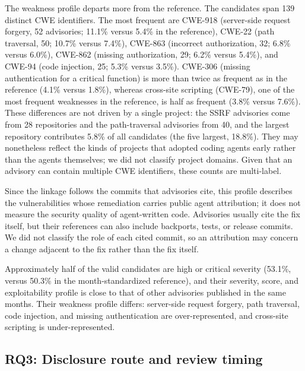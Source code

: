 \documentclass[smallextended,natbib]{svjour3}
\begin{document}
The weakness profile departs more from the reference.  The candidates span 139
distinct CWE identifiers.  The most frequent are CWE-918 (server-side request
forgery, 52 advisories; 11.1\% versus 5.4\% in the reference), CWE-22 (path
traversal, 50; 10.7\% versus 7.4\%), CWE-863 (incorrect authorization, 32;
6.8\% versus 6.0\%), CWE-862 (missing authorization, 29; 6.2\% versus 5.4\%),
and CWE-94 (code injection, 25; 5.3\% versus 3.5\%).  CWE-306 (missing
authentication for a critical function) is more than twice as frequent as in
the reference (4.1\% versus 1.8\%), whereas cross-site scripting (CWE-79),
one of the most frequent weaknesses in the reference, is half as frequent
(3.8\% versus 7.6\%).  These differences are not driven by a single project:
the SSRF advisories come from 28 repositories and the path-traversal advisories
from 40, and the largest repository contributes 5.8\% of all candidates (the
five largest, 18.8\%).  They may nonetheless reflect the kinds of projects that
adopted coding agents early rather than the agents themselves; we did not
classify project domains.  Given that an advisory can contain multiple CWE
identifiers, these counts are multi-label.

Since the linkage follows the commits that advisories cite, this profile
describes the vulnerabilities whose remediation carries public agent
attribution; it does not measure the security quality of agent-written code.
Advisories usually cite the fix itself, but their references can also include
backports, tests, or release commits.  We did not classify the role of each
cited commit, so an attribution may concern a change adjacent to the fix rather
than the fix itself.

\begin{resultbox}
Approximately half of the valid candidates are high or critical severity (53.1\%,
versus 50.3\% in the month-standardized reference), and their severity, score,
and exploitability profile is close to that of other advisories published in
the same months.  Their weakness profile differs: server-side request forgery,
path traversal, code injection, and missing authentication are
over-represented, and cross-site scripting is under-represented.
\end{resultbox}

\subsection{RQ3: Disclosure route and review timing}
\label{sec:rq3}
\end{document}
